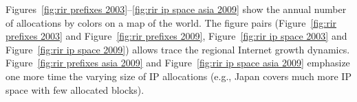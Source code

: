 Figures~\ref{fig:rir prefixes 2003}--\ref{fig:rir ip space asia 2009} show the
annual number of allocations by colors on a map of the world. The figure pairs
(Figure~\ref{fig:rir prefixes 2003} and Figure~\ref{fig:rir prefixes 2009},
Figure~\ref{fig:rir ip space 2003} and Figure~\ref{fig:rir ip space 2009})
allows trace the regional Internet growth dynamics. Figure~\ref{fig:rir
prefixes asia 2009} and Figure~\ref{fig:rir ip space asia 2009} emphasize one
more time the varying size of IP allocations (e.g., Japan covers much more IP
space with few allocated blocks).




